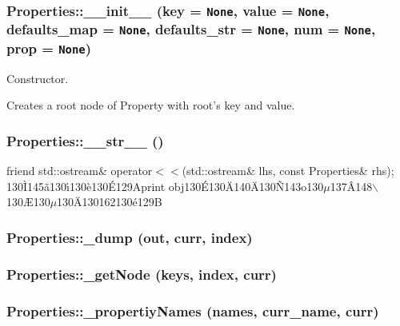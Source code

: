 \subsubsection{\setlength{\rightskip}{0pt plus 5cm}Properties::\_\-\_\-init\_\-\_\- (key = {\tt None}, value = {\tt None}, defaults\_\-map = {\tt None}, defaults\_\-str = {\tt None}, num = {\tt None}, prop = {\tt None})}\label{classProperties_Propertiesa0}


Constructor. 

Creates a root node of Property with root's key and value.
\subsubsection{\setlength{\rightskip}{0pt plus 5cm}Properties::\_\-\_\-str\_\-\_\- ()}\label{classProperties_Propertiesa32}


friend std::ostream\& operator$<$$<$(std::ostream\& lhs, const Properties\& rhs); 130\`{I}145\~{a}130\'{\i}130\`{e}130\'{E}129Aprint obj130\'{E}130\"{A}140\"{A}130\~{N}143o130$\mu$137\^{A}148$\backslash$130\AE{}130$\mu$130\"{A}130162130\'{e}129B
\subsubsection{\setlength{\rightskip}{0pt plus 5cm}Properties::\_\-dump (out, curr, index)}\label{classProperties_Propertiesa31}


\subsubsection{\setlength{\rightskip}{0pt plus 5cm}Properties::\_\-get\-Node (keys, index, curr)}\label{classProperties_Propertiesa27}


\subsubsection{\setlength{\rightskip}{0pt plus 5cm}Properties::\_\-propertiy\-Names (names, curr\_\-name, curr)}\label{classProperties_Propertiesa28}


